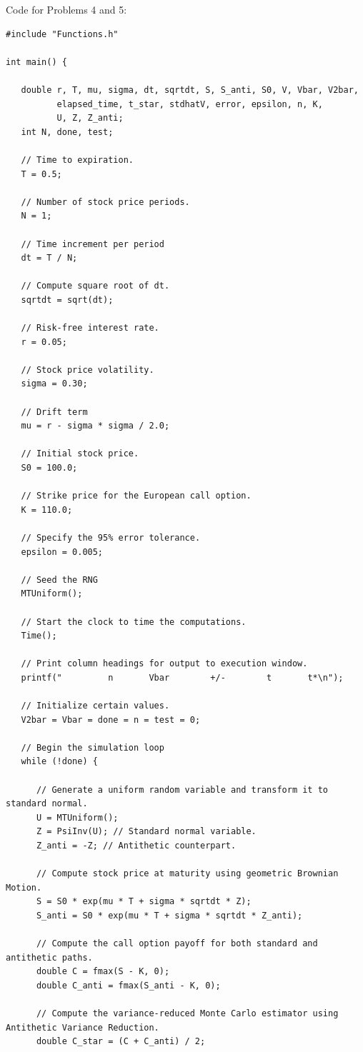 \documentclass{report}
\begin{document}
Code for Problems 4 and 5:
\begin{lstlisting}
#include "Functions.h"

int main() {

   double r, T, mu, sigma, dt, sqrtdt, S, S_anti, S0, V, Vbar, V2bar,
          elapsed_time, t_star, stdhatV, error, epsilon, n, K,
          U, Z, Z_anti;
   int N, done, test;

   // Time to expiration.
   T = 0.5;

   // Number of stock price periods.
   N = 1;

   // Time increment per period
   dt = T / N;

   // Compute square root of dt.
   sqrtdt = sqrt(dt);

   // Risk-free interest rate.
   r = 0.05;

   // Stock price volatility.
   sigma = 0.30;

   // Drift term 
   mu = r - sigma * sigma / 2.0;

   // Initial stock price.
   S0 = 100.0;

   // Strike price for the European call option.
   K = 110.0;

   // Specify the 95% error tolerance.
   epsilon = 0.005;

   // Seed the RNG
   MTUniform();

   // Start the clock to time the computations.
   Time();

   // Print column headings for output to execution window.
   printf("         n       Vbar        +/-        t       t*\n");

   // Initialize certain values.
   V2bar = Vbar = done = n = test = 0;

   // Begin the simulation loop
   while (!done) {

      // Generate a uniform random variable and transform it to standard normal.
      U = MTUniform();
      Z = PsiInv(U); // Standard normal variable.
      Z_anti = -Z; // Antithetic counterpart.

      // Compute stock price at maturity using geometric Brownian Motion.
      S = S0 * exp(mu * T + sigma * sqrtdt * Z);
      S_anti = S0 * exp(mu * T + sigma * sqrtdt * Z_anti);

      // Compute the call option payoff for both standard and antithetic paths.
      double C = fmax(S - K, 0);
      double C_anti = fmax(S_anti - K, 0);

      // Compute the variance-reduced Monte Carlo estimator using Antithetic Variance Reduction.
      double C_star = (C + C_anti) / 2; 


\end{lstlisting}
\end{document}
